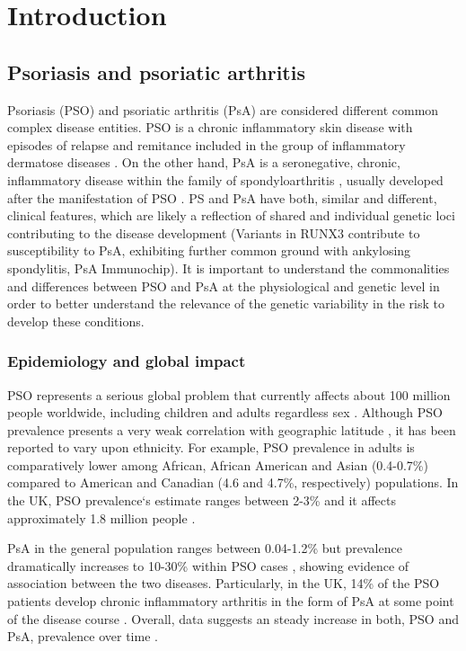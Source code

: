 \chapter{Introduction}
\label{ch:Intro}




\section{Psoriasis and psoriatic arthritis}
%
Psoriasis (PSO) and psoriatic arthritis (PsA) are considered different common complex disease entities. PSO is a chronic inflammatory skin disease with episodes of relapse and remitance included in the group of inflammatory dermatose diseases \parencite{Nestle2009}. On the other hand, PsA is a seronegative, chronic, inflammatory disease within the family of spondyloarthritis \parencite{Moll1973, Coates2016}, usually developed after the manifestation of PSO \parencite{Villanova2016}. PS and PsA have both, similar and different, clinical features, which are likely a reflection of shared and individual genetic loci contributing to the disease development (Variants in RUNX3 contribute to susceptibility to PsA, exhibiting further common ground with ankylosing spondylitis, PsA Immunochip). It is important to understand the commonalities and differences between PSO and PsA at the physiological and genetic level in order to better understand the relevance of the genetic variability in the risk to develop these conditions.

\subsection{Epidemiology and global impact}
%
PSO represents a serious global problem that currently affects about 100 million people worldwide, including children and adults regardless sex \parencite{Organization2016}. Although PSO prevalence presents a very weak correlation with geographic latitude \parencite{Jacobson2011}, it has been reported to vary upon ethnicity. For example, PSO prevalence in adults is comparatively lower among African, African American and Asian (0.4-0.7\%) compared to American and Canadian (4.6 and 4.7\%, respectively) populations. In the UK, PSO prevalence`s estimate ranges between 2-3\% and it affects approximately 1.8 million people \parencite{Perera2012}.

PsA in the general population ranges between 0.04-1.2\% \parencite{Perera2012} but prevalence dramatically increases to 10-30\% within PSO cases \parencite{Gelfand2005,Reich2008}, showing evidence of association between the two diseases. Particularly, in the UK, 14\% of the PSO patients develop chronic inflammatory arthritis in the form of PsA at some point of the disease course \parencite{Ibrahim2009}. Overall, data suggests an steady increase in both, PSO and PsA, prevalence over time \parencite{Springate2007,Organization2016}.

